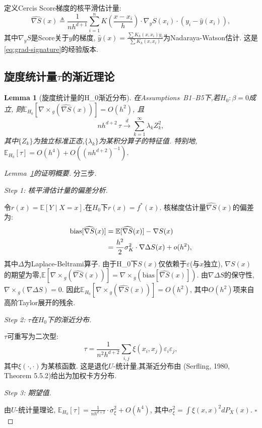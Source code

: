 \documentclass[12pt,a4paper]{article}
\newtheorem{lemma}[theorem]{Lemma}
\newcommand{\E}{\mathbb{E}}
\newcommand{\curl}{\nabla\! \times\!}
\newcommand{\defeq}{\triangleq}
\newcommand{\bias}{\mathrm{bias}}
\begin{document}
定义Cercis Score梯度的核平滑估计量:
\begin{equation}\label{eq:grad-estimator}
    \widehat{\nabla S}(x) \defeq \frac{1}{n h^{d+1}}
    \sum_{i=1}^n K\!\left(\frac{x - x_i}{h}\right)
    \cdot \nabla_y S(x_i) \cdot (y_i - \hat{y}(x_i)),
\end{equation}
其中$\nabla_y S$是Score关于$y$的梯度,
$\hat{y}(x) = \frac{\sum K_h(x, x_i) y_i}{\sum K_h(x, x_i)}$为Nadaraya-Watson估计.
这是\eqref{eq:grad-signature}的经验版本.

\subsection{旋度统计量$\tau$的渐近理论}

\begin{lemma}[旋度统计量的H_0渐近分布]\label{lem:tau-null}
    在Assumptions~B1--B5下,若$H_0: \beta = 0$成立,
    则$\E_{H_0}[\curl_g(\widehat{\nabla S}(x))] = O(h^2)$,
    且
    \begin{equation}\label{eq:tau-null-asym}
        n h^{d+2}\,\tau \xrightarrow{d} \sum_{k=1}^\infty \lambda_k Z_k^2,
    \end{equation}
    其中$\{Z_k\}$为独立标准正态,$\{\lambda_k\}$为某积分算子的特征值.
    特别地,$\E_{H_0}[\tau] = O(h^4) + O((n h^{d+2})^{-1})$.
\end{lemma}

\begin{proof}[Lemma~\ref{lem:tau-null}的证明概要]
    分三步.

    \textit{Step 1: 核平滑估计量的偏差分析.}

    令$r(x) = \E[Y \mid X=x]$.在$H_0$下$r(x) = f^*(x)$.
    核梯度估计量$\widehat{\nabla S}(x)$的偏差为:
    \begin{align}
        \bias[\widehat{\nabla S}(x)] &= \E[\widehat{\nabla S}(x)] - \nabla S(x) \notag\\
        &= \frac{h^2}{2} \sigma_K^2 \cdot \nabla \Delta S(x) + o(h^2),
    \end{align}
    其中$\Delta$为Laplace-Beltrami算子.
    由于H_0下$S(x)$仅依赖于$\varepsilon$(与$x$独立),
    $\nabla S(x)$的期望为零,$\E[\curl_g(\widehat{\nabla S}(x))] = \curl_g(\bias[\widehat{\nabla S}(x)])$.
    由$\nabla \Delta S$的保守性,$\curl_g(\nabla \Delta S) = 0$.
    因此$\E_{H_0}[\curl_g(\widehat{\nabla S}(x))] = O(h^2)$,
    其中$O(h^2)$项来自高阶Taylor展开的残余.

    \textit{Step 2: $\tau$在$H_0$下的渐近分布.}

    $\tau$可重写为二次型:
    \begin{equation}
        \tau = \frac{1}{n^2 h^{d+2}} \sum_{i,j} \xi(x_i, x_j) \varepsilon_i \varepsilon_j,
    \end{equation}
    其中$\xi(\cdot, \cdot)$为某核函数.
    这是退化$U$-统计量,其渐近分布由
    (Serfling, 1980, Theorem 5.5.2)给出为加权卡方分布.

    \textit{Step 3: 期望值.}

    由$U$-统计量理论,
    $\E_{H_0}[\tau] = \frac{1}{n h^{d+2}} \cdot \sigma_\xi^2 + O(h^4)$,
    其中$\sigma_\xi^2 = \int \xi(x, x)^2 dP_X(x)$.
    \hfill$\square$
\end{proof}
\end{document}
